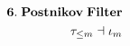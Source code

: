 \documentclass[preview]{standalone}
\begin{document}
\begin{align*}
\special{dvisvgm:raw <g id='unique000'>}\mathbf{6.\;Postnikov\;Filter}\\\tau_{\le m}\dashv\iota_m\special{dvisvgm:raw </g>}
\end{align*}
\end{document}
